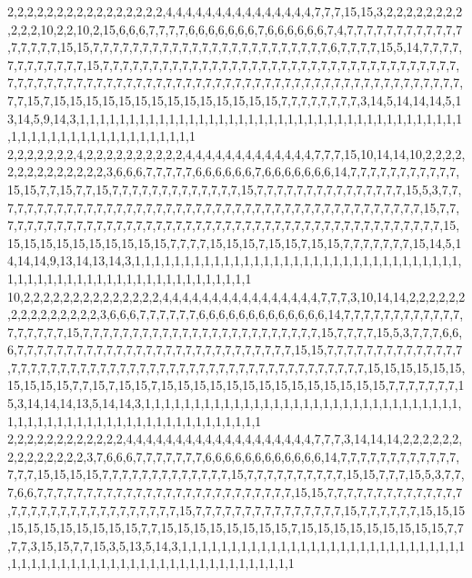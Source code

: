 2,2,2,2,2,2,2,2,2,2,2,2,2,2,2,2,4,4,4,4,4,4,4,4,4,4,4,4,4,4,4,7,7,7,15,15,3,2,2,2,2,2,2,2,2,2,2,2,10,2,2,10,2,15,6,6,6,7,7,7,7,6,6,6,6,6,6,6,7,6,6,6,6,6,6,7,4,7,7,7,7,7,7,7,7,7,7,7,7,7,7,7,7,7,15,15,7,7,7,7,7,7,7,7,7,7,7,7,7,7,7,7,7,7,7,7,7,7,7,7,6,7,7,7,7,15,5,14,7,7,7,7,7,7,7,7,7,7,7,7,15,7,7,7,7,7,7,7,7,7,7,7,7,7,7,7,7,7,7,7,7,7,7,7,7,7,7,7,7,7,7,7,7,7,7,7,7,7,7,7,7,7,7,7,7,7,7,7,7,7,7,7,7,7,7,7,7,7,7,7,7,7,7,7,7,7,7,7,7,7,7,7,7,7,7,7,7,7,7,7,7,7,7,7,7,15,7,15,15,15,15,15,15,15,15,15,15,15,15,15,15,7,7,7,7,7,7,7,7,3,14,5,14,14,14,5,13,14,5,9,14,3,1,1,1,1,1,1,1,1,1,1,1,1,1,1,1,1,1,1,1,1,1,1,1,1,1,1,1,1,1,1,1,1,1,1,1,1,1,1,1,1,1,1,1,1,1,1,1,1,1,1,1,1,1,1,1,1,1,1
2,2,2,2,2,2,2,4,2,2,2,2,2,2,2,2,2,2,4,4,4,4,4,4,4,4,4,4,4,4,4,7,7,7,15,10,14,14,10,2,2,2,2,2,2,2,2,2,2,2,2,2,2,3,6,6,6,7,7,7,7,7,6,6,6,6,6,6,7,6,6,6,6,6,6,6,14,7,7,7,7,7,7,7,7,7,7,7,15,15,7,7,15,7,7,15,7,7,7,7,7,7,7,7,7,7,7,7,7,15,7,7,7,7,7,7,7,7,7,7,7,7,7,7,7,15,5,3,7,7,7,7,7,7,7,7,7,7,7,7,7,7,7,7,7,7,7,7,7,7,7,7,7,7,7,7,7,7,7,7,7,7,7,7,7,7,7,7,7,7,7,7,15,7,7,7,7,7,7,7,7,7,7,7,7,7,7,7,7,7,7,7,7,7,7,7,7,7,7,7,7,7,7,7,7,7,7,7,7,7,7,7,7,7,7,7,7,7,7,15,15,15,15,15,15,15,15,15,15,15,7,7,7,7,15,15,15,7,15,15,7,15,15,7,7,7,7,7,7,7,15,14,5,14,14,14,9,13,14,13,14,3,1,1,1,1,1,1,1,1,1,1,1,1,1,1,1,1,1,1,1,1,1,1,1,1,1,1,1,1,1,1,1,1,1,1,1,1,1,1,1,1,1,1,1,1,1,1,1,1,1,1,1,1,1,1,1,1,1,1
10,2,2,2,2,2,2,2,2,2,2,2,2,2,2,4,4,4,4,4,4,4,4,4,4,4,4,4,4,4,4,7,7,7,3,10,14,14,2,2,2,2,2,2,2,2,2,2,2,2,2,2,2,3,6,6,6,7,7,7,7,7,7,6,6,6,6,6,6,6,6,6,6,6,6,6,14,7,7,7,7,7,7,7,7,7,7,7,7,7,7,7,7,7,7,15,7,7,7,7,7,7,7,7,7,7,7,7,7,7,7,7,7,7,7,7,7,7,7,7,15,7,7,7,7,15,5,3,7,7,7,6,6,6,7,7,7,7,7,7,7,7,7,7,7,7,7,7,7,7,7,7,7,7,7,7,7,7,7,7,7,7,15,15,7,7,7,7,7,7,7,7,7,7,7,7,7,7,7,7,7,7,7,7,7,7,7,7,7,7,7,7,7,7,7,7,7,7,7,7,7,7,7,7,7,7,7,7,7,7,7,7,7,7,15,15,15,15,15,15,15,15,15,15,7,7,15,7,15,15,7,15,15,15,15,15,15,15,15,15,15,15,15,15,15,7,7,7,7,7,7,7,15,3,14,14,14,13,5,14,14,3,1,1,1,1,1,1,1,1,1,1,1,1,1,1,1,1,1,1,1,1,1,1,1,1,1,1,1,1,1,1,1,1,1,1,1,1,1,1,1,1,1,1,1,1,1,1,1,1,1,1,1,1,1,1,1,1,1,1
2,2,2,2,2,2,2,2,2,2,2,2,4,4,4,4,4,4,4,4,4,4,4,4,4,4,4,4,4,4,4,7,7,7,3,14,14,14,2,2,2,2,2,2,2,2,2,2,2,2,2,2,3,7,6,6,6,7,7,7,7,7,7,7,6,6,6,6,6,6,6,6,6,6,6,6,14,7,7,7,7,7,7,7,7,7,7,7,7,7,7,7,15,15,15,15,7,7,7,7,7,7,7,7,7,7,7,7,7,15,7,7,7,7,7,7,7,7,7,7,15,15,7,7,7,15,5,3,7,7,7,6,6,7,7,7,7,7,7,7,7,7,7,7,7,7,7,7,7,7,7,7,7,7,7,7,7,7,7,15,15,7,7,7,7,7,7,7,7,7,7,7,7,7,7,7,7,7,7,7,7,7,7,7,7,7,7,7,7,7,7,7,15,7,7,7,7,7,7,7,7,7,7,7,7,7,7,7,15,7,7,7,7,7,7,15,15,15,15,15,15,15,15,15,15,15,7,7,15,15,15,15,15,15,15,15,7,15,15,15,15,15,15,15,15,15,7,7,7,7,3,15,15,7,7,15,3,5,13,5,14,3,1,1,1,1,1,1,1,1,1,1,1,1,1,1,1,1,1,1,1,1,1,1,1,1,1,1,1,1,1,1,1,1,1,1,1,1,1,1,1,1,1,1,1,1,1,1,1,1,1,1,1,1,1,1,1,1,1,1
